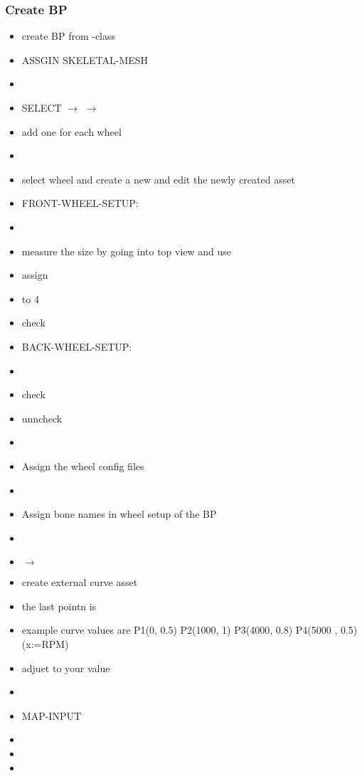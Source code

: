         \subsubsection{Create BP}
            \begin{itemize}
                \item create BP from -class
                \item ASSGIN SKELETAL-MESH
                \item 
                \item SELECT  $\rightarrow$  $\rightarrow$ 
                \item add one for each wheel
                \item 
                \item select wheel and create a new  and edit the newly created asset
                \item FRONT-WHEEL-SETUP:
                \item {}
                \item measure the size by going into top view and use 
                \item assign  
                \item {} to 4
                \item check 
                \item BACK-WHEEL-SETUP:
                \item {}
                \item check 
                \item unncheck 
                \item 
                \item Assign the wheel config files
                \item 
                \item Assign bone names in wheel setup of the BP
                \item 
                \item {} $\rightarrow$ 
                \item create external curve asset
                \item the last pointn is 
                \item example curve values are P1(0, 0.5) P2(1000, 1) P3(4000, 0.8) P4(5000 , 0.5) (x:=RPM)
                \item adjuet  to your value
                \item 
                \item MAP-INPUT
                \item {}
                \item {}
                \item {}
            \end{itemize}

